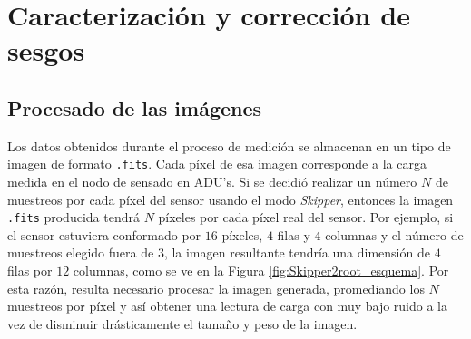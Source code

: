 \chapter{Caracterización y corrección de sesgos \label{chap:Analisis}}

\section{Procesado de las imágenes \label{sec:ProcesadoDatos}}
\noindent Los datos obtenidos durante el proceso de medición se almacenan en un tipo de imagen de formato \verb|.fits|. Cada píxel de esa imagen corresponde a la carga medida en el nodo de sensado en ADU's. Si se decidió realizar un número $N$ de muestreos por cada píxel del sensor usando el modo \textit{Skipper}, entonces la imagen \verb|.fits| producida tendrá $N$ píxeles por cada píxel real del sensor. Por ejemplo, si el sensor estuviera conformado por $16$ píxeles, $4$ filas y $4$ columnas y el número de muestreos elegido fuera de $3$, la imagen resultante tendría una dimensión de $4$ filas por $12$ columnas, como se ve en la Figura \ref{fig:Skipper2root_esquema}. 
Por esta razón, resulta necesario procesar la imagen generada, promediando los $N$ muestreos por píxel y así obtener una lectura de carga con muy bajo ruido a la vez de disminuir drásticamente el tamaño y peso de la imagen.


